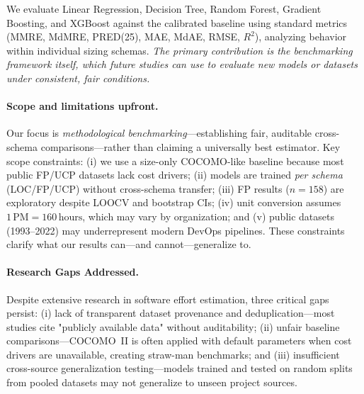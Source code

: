 \documentclass{ieeeaccess}
\begin{document}
We evaluate Linear Regression, Decision Tree, Random Forest, Gradient Boosting, and XGBoost against the calibrated baseline using standard metrics (MMRE, MdMRE, PRED(25), MAE, MdAE, RMSE, $R^2$), analyzing behavior within individual sizing schemas. \textit{The primary contribution is the benchmarking framework itself, which future studies can use to evaluate new models or datasets under consistent, fair conditions.}

\paragraph{Scope and limitations upfront.}
Our focus is \emph{methodological benchmarking}—establishing fair, auditable cross-schema comparisons—rather than claiming a universally best estimator.
Key scope constraints:
(i) we use a size-only COCOMO-like baseline because most public FP/UCP datasets lack cost drivers;
(ii) models are trained \emph{per schema} (LOC/FP/UCP) without cross-schema transfer;
(iii) FP results ($n{=}158$) are exploratory despite LOOCV and bootstrap CIs;
(iv) unit conversion assumes $1\,\text{PM}{=}160\,\text{hours}$, which may vary by organization; and
(v) public datasets (1993--2022) may underrepresent modern DevOps pipelines.
These constraints clarify what our results can—and cannot—generalize to.

\paragraph{Research Gaps Addressed.}
Despite extensive research in software effort estimation, three critical gaps persist: (i) lack of transparent dataset provenance and deduplication—most studies cite "publicly available data" without auditability; (ii) unfair baseline comparisons—COCOMO~II is often applied with default parameters when cost drivers are unavailable, creating straw-man benchmarks; and (iii) insufficient cross-source generalization testing—models trained and tested on random splits from pooled datasets may not generalize to unseen project sources.
\end{document}

